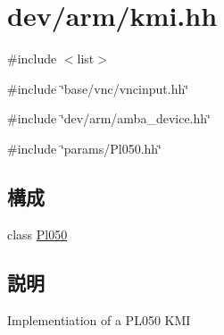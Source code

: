\hypertarget{kmi_8hh}{
\section{dev/arm/kmi.hh}
\label{kmi_8hh}
}
{\ttfamily \#include $<$list$>$}\par
{\ttfamily \#include \char`\"{}base/vnc/vncinput.hh\char`\"{}}\par
{\ttfamily \#include \char`\"{}dev/arm/amba\_\-device.hh\char`\"{}}\par
{\ttfamily \#include \char`\"{}params/Pl050.hh\char`\"{}}\par
\subsection*{構成}
\begin{DoxyCompactItemize}
\item 
class \hyperlink{classPl050}{Pl050}
\end{DoxyCompactItemize}


\subsection{説明}
Implementiation of a PL050 KMI 